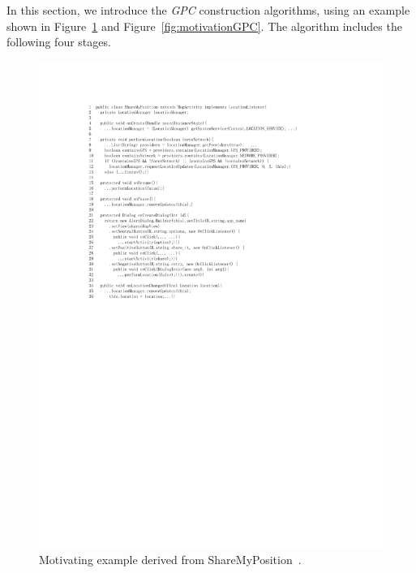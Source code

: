 In this section, we introduce the \textit{GPC} construction algorithms, using an example shown in Figure~\ref{fig:1} and Figure~\ref{fig:motivationGPC}. 
The algorithm includes the following four stages. %
  \begin{figure}[!t]%
  \centering  
  \includegraphics[width=0.65\linewidth]{pic/motivation1.pdf}  
  \caption{Motivating example derived from ShareMyPosition~\cite{newShareMyPosition}.}  
  \label{fig:1}  
  \end{figure} 
